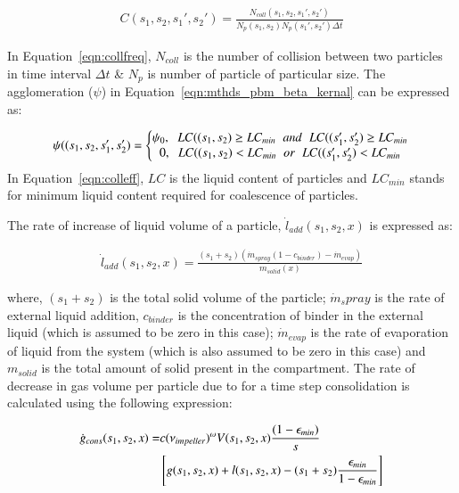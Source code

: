 \documentclass[preprint,11pt,authoryear]{elsarticle}
\begin{document}
\begin{align}
C(s_1,s_2,s_1',s_2')=\frac{N_{coll}(s_1,s_2,s_1',s_2')}{N_p(s_1,s_2)N_p(s_1',s_2')\Delta t}
\label{eqn:collfreq}
\end{align}

In Equation~\ref{eqn:collfreq}, $N_{coll}$ is the number of collision between two particles in 
time interval $\Delta t$ \& $N_p$ is number of particle of particular size. The agglomeration 
($\psi$) in Equation~\ref{eqn:mthds_pbm_beta_kernal} can be expressed as:

\begin{align}
\psi((s_1,s_2,s_1',s_2') = 
\left\{\begin{matrix}
\psi_0,\hspace{0.2cm} LC((s_1,s_2) \geq LC_{min}\hspace{0.2cm} and\hspace{0.2cm} LC((s_1',s_2') \geq LC_{min}	\\ 
0,\hspace{0.2cm} LC((s_1,s_2) < LC_{min}\hspace{0.2cm} or\hspace{0.2cm} LC((s_1',s_2') < LC_{min}
\end{matrix}\right.
\label{eqn:colleff}
\end{align}
 In Equation~\ref{eqn:colleff}, $LC$ is the liquid content of particles and $LC_{min}$ stands for minimum 
 liquid content required for coalescence of particles. 

The rate of increase of liquid volume of a particle, $\dot{l}_{add}(s_1,s_2,x)$ is expressed as:

\begin{align}
\dot{l}_{add}(s_1,s_2,x) = \frac{(s_1+s_2)(\dot{m}_{spray}(1-c_{binder})-\dot{m}_{evap})}{m_{solid}(x)}
\end{align}

where, $(s_1+s_2)$  is the total solid volume of the particle; $\dot{m}_spray$ is the rate of external 
liquid addition, $c_{binder}$ is the concentration of binder in the external liquid (which is assumed to 
be zero in this case); $\dot{m}_{evap}$ is the rate of evaporation of liquid from 
the system (which is also assumed to be zero in this case) and $m_{solid}$ is the total amount of solid 
present in the compartment.
The rate of decrease in gas volume per particle due to for a time step consolidation is calculated using the 
following expression:~\citep{Verkoeijen2002} 

\begin{align}
\dot{g}_{cons}(s_1,s_2,x)=&c (\nu_{impeller})^{\omega}V(s_1,s_2,x)\frac{(1-\epsilon_{min})}{s} 
\notag \\ 
& \left[g(s_1,s_2,x)+l(s_1,s_2,x) -(s_1+s_2)\frac{\epsilon_{min}}{1-\epsilon_{min}}\right]
\end{align}        
\end{document}
